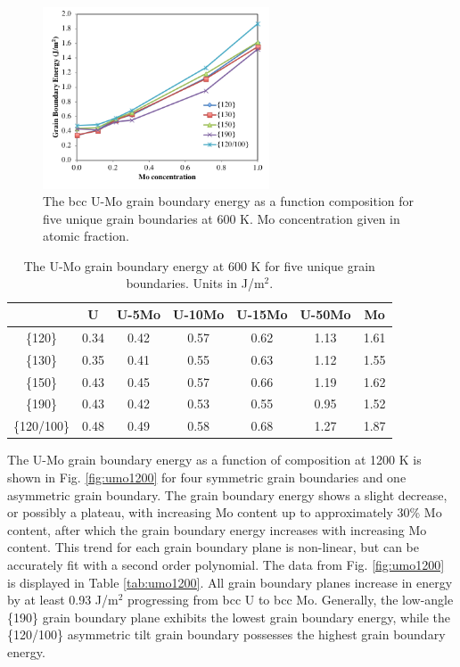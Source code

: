 \documentclass[review]{elsarticle}
\providecommand{\DIFaddbeginFL}{} %
\providecommand{\DIFaddendFL}{} %
\providecommand{\DIFdelbeginFL}{} %
\providecommand{\DIFdelendFL}{} %
\newcommand{\DIFscaledelfig}{0.5}
\newlength{\DIFdelgraphicswidth} %
\newlength{\DIFdelgraphicsheight} %
\newcommand{\DIFaddincludegraphics}[2][]{{\color{blue}\fbox{\DIFOincludegraphics[#1]{#2}}}} %
\newcommand{\DIFdelincludegraphics}[2][]{%
\sbox{\DIFdelgraphicsbox}{\DIFOincludegraphics[#1]{#2}}%
\settoboxwidth{\DIFdelgraphicswidth}{\DIFdelgraphicsbox} %
\settoboxtotalheight{\DIFdelgraphicsheight}{\DIFdelgraphicsbox} %
\scalebox{\DIFscaledelfig}{%
\parbox[b]{\DIFdelgraphicswidth}{\usebox{\DIFdelgraphicsbox}\\[-\baselineskip] \rule{\DIFdelgraphicswidth}{0em}}\llap{\resizebox{\DIFdelgraphicswidth}{\DIFdelgraphicsheight}{%
\setlength{\unitlength}{\DIFdelgraphicswidth}%
\begin{picture}(1,1)%
\thicklines\linethickness{2pt} %
{\color[rgb]{1,0,0}\put(0,0){\framebox(1,1){}}}%
{\color[rgb]{1,0,0}\put(0,0){\line( 1,1){1}}}%
{\color[rgb]{1,0,0}\put(0,1){\line(1,-1){1}}}%
\end{picture}%
}\hspace*{3pt}}} %
} %
\DeclareRobustCommand{\DIFaddbeginFL}{\DIFOaddbeginFL \let\includegraphics\DIFaddincludegraphics} %
\DeclareRobustCommand{\DIFaddendFL}{\DIFOaddendFL \let\includegraphics\DIFOincludegraphics} %
\DeclareRobustCommand{\DIFdelbeginFL}{\DIFOdelbeginFL \let\includegraphics\DIFdelincludegraphics} %
\DeclareRobustCommand{\DIFdelendFL}{\DIFOaddendFL \let\includegraphics\DIFOincludegraphics} %
\begin{document}
\begin{figure}[h]
 \centering
 \DIFdelbeginFL %
\DIFdelendFL \DIFaddbeginFL \includegraphics[width=0.6\textwidth]{uvsmo600A.png} 
 \DIFaddendFL \caption{The bcc U-Mo grain boundary energy as a function composition for five unique grain boundaries at 600 K. Mo concentration given in atomic fraction.}
 \label{fig:umo600}
\end{figure}

\FloatBarrier

\begin{table}[h]
\caption{The U-Mo grain boundary energy at 600 K for five unique grain boundaries. Units in J/m$^{2}$. } \label{tab:umo600}
\begin{center}
\begin{tabular}{|c|c|c|c|c|c|c|}
	\hline
 & U & U-5Mo & U-10Mo & U-15Mo & U-50Mo & Mo \\
\hline
\{120\} & 0.34 & 0.42 & 0.57 & 0.62 & 1.13 & 1.61 \\
\{130\} & 0.35 & 0.41 & 0.55 & 0.63 & 1.12 & 1.55 \\ 
\{150\} & 0.43 & 0.45 & 0.57 & 0.66 & 1.19 & 1.62 \\ 
\{190\}	 & 0.43 & 0.42 & 0.53 & 0.55 & 0.95 & 1.52 \\ 
\{120/100\} & 0.48 & 0.49 & 0.58 & 0.68 & 1.27 & 1.87 \\
 	 \hline
\end{tabular}
\end{center}
\label{default}
\end{table}

\FloatBarrier

The U-Mo grain boundary energy as a function of composition at 1200 K is shown in Fig. \ref{fig:umo1200} for four symmetric grain boundaries and one asymmetric grain boundary. The grain boundary energy shows a slight decrease, or possibly a plateau, with increasing Mo content up to approximately 30\% Mo content, after which the grain boundary energy increases with increasing Mo content. This trend for each grain boundary plane is non-linear, but can be accurately fit with a second order polynomial. The data from Fig. \ref{fig:umo1200} is displayed in Table \ref{tab:umo1200}. All grain boundary planes increase in energy by at least 0.93 J/m$^{2}$ progressing from bcc U to bcc Mo. Generally, the low-angle \{190\} grain boundary plane exhibits the lowest grain boundary energy, while the \{120/100\} asymmetric tilt grain boundary possesses the highest grain boundary energy.
\end{document}

